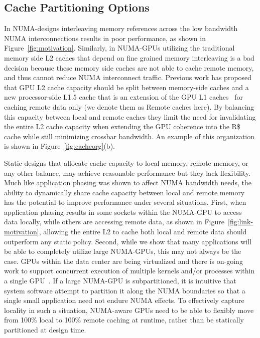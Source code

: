 \subsection{Cache Partitioning Options}
In NUMA-designs interleaving memory references across the low bandwidth NUMA
interconnections results in poor performance, as shown in Figure~\ref{fig:motivation}.
Similarly, in NUMA-GPUs utilizing the traditional memory side L2 caches that 
depend on fine grained memory interleaving is a bad decision because these memory
side caches are not able to cache remote memory, and thus cannot reduce NUMA
interconnect traffic.  Previous work has proposed that GPU L2 cache capacity
should be split between memory-side caches and a new processor-side L1.5 cache
that is an extension of the GPU L1 caches~\cite{Arunkumar2017} for caching remote
data only (we denote them as Remote caches here). By balancing this capacity between local and remote caches they limit the 
need for invalidating the entire L2 cache capacity when extending the GPU coherence 
into the R\$ cache while still minimizing crossbar bandwidth. An example of this 
organization is shown in Figure~\ref{fig:cacheorg}(b).

Static designs that allocate cache capacity to local memory, remote memory, or any other balance,
 may achieve reasonable performance but they lack flexibility. Much
like application phasing was shown to affect NUMA bandwidth needs, the ability to
dynamically share cache capacity between local and remote memory has the potential
to improve performance under several situations. First, when application phasing
results in some sockets within the NUMA-GPU to access data locally, while others
are accessing remote data, as shown in Figure~\ref{fig:link-motivation}, allowing the entire L2 to cache both local and remote data should outperform any static policy. Second, while we show that many
applications will be able to completely utilize large NUMA-GPUs, this may not always
be the case.  GPUs within the data center are being virtualized and there is on-going
work to support concurrent execution of multiple kernels and/or processes within a
single GPU~\cite{XXX}. If a large NUMA-GPU is subpartitioned, it is intuitive that system
software attempt to partition it along the NUMA boundaries so that a single small
application need not endure NUMA effects.  To effectively capture locality in such
a situation, NUMA-aware GPUs need to be able to flexibly move from 100\% local to
100\% remote caching at runtime, rather than be statically partitioned at design time.

